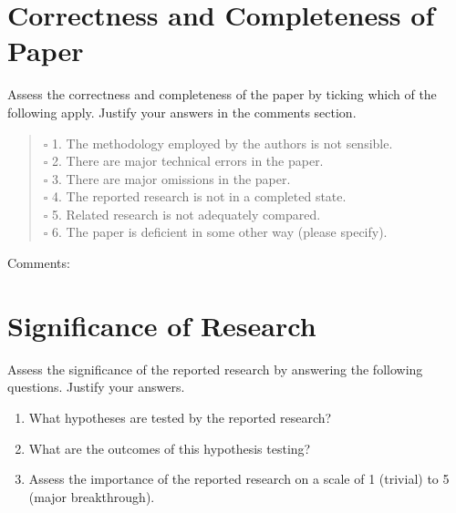 \documentclass{article}
\begin{document}
\section{Correctness and Completeness of Paper}
{\small Assess the correctness and completeness of the paper by
ticking which of the following apply. Justify your answers in
the comments section.}
\begin{verse}



$\square$
1. The methodology employed by the authors is not sensible.  \\
$\square$
2. There are major technical errors in the paper.  \\
$\square$
3. There are major omissions in the paper.  \\
$\square$
4. The reported research is not in a completed state.  \\
$\square$
5. Related research is not adequately compared.  \\
$\square$
6. The paper is deficient in some other way (please specify).  \\
\end{verse}
Comments: \\
\boxed{}

\section{Significance of Research}
Assess the significance of the reported research by answering the
following questions. Justify your answers.
\begin{enumerate}

\item   What hypotheses are tested by the reported research? \\
\boxed{}

\item   What are the outcomes of this hypothesis testing? \\
\boxed{}

\item   Assess the importance of the reported research on a scale of 1
(trivial) to 5 (major breakthrough).  \\
\boxed{}
\end{enumerate}
\end{document}
